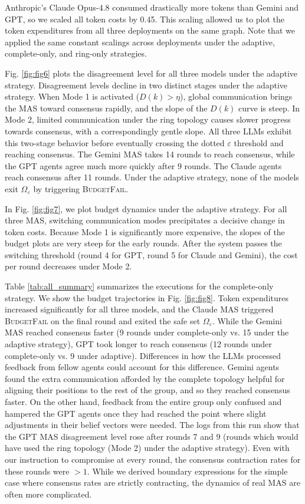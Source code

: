 \documentclass[journal,twoside,web]{ieeecolor_no_firstpage_logo}
\begin{document}
Anthropic's Claude Opus-4.8 consumed drastically more tokens than Gemini and GPT, so we scaled all token costs by 0.45. This scaling allowed us to plot the token expenditures from all three deployments on the same graph. Note that we applied the same constant scalings across deployments under the adaptive, complete-only, and ring-only strategies. 

Fig. \ref{fig:fig6} plots the disagreement level for all three models under the adaptive strategy. Disagreement levels decline in two distinct stages under the adaptive strategy. When Mode 1 is activated ($D(k)> \eta$), global communication brings the MAS toward consensus rapidly, and the slope of the $D(k)$ curve is steep. In Mode 2, limited communication under the ring topology causes slower progress towards consensus, with a correspondingly gentle slope. All three LLMs exhibit this two-stage behavior before eventually crossing the dotted $\varepsilon$ threshold and reaching consensus.
 The Gemini MAS takes 14 rounds to reach consensus, while the GPT agents agree much more quickly after 9 rounds. The Claude agents reach consensus after 11 rounds. Under the adaptive strategy, none of the  models exit $\Omega_\varepsilon$ by triggering \textsc{BudgetFail}. 

In Fig. \ref{fig:fig7}, we plot budget dynamics under the adaptive strategy. For all three MAS, switching communication modes precipitates a decisive change in token costs. Because Mode 1 is significantly more expensive, the slopes of the budget plots are very steep for the early rounds. After the system passes the switching threshold (round 4 for GPT, round 5 for Claude and Gemini), the cost per round decreases under Mode 2.

Table \ref{tab:all_summary} summarizes the executions for the complete-only strategy. We show the budget trajectories in Fig. \ref{fig:fig8}. Token expenditures increased significantly for all three models, and the Claude MAS triggered \textsc{BudgetFail} on the final round and exited the safe set $\Omega_\varepsilon$. While the Gemini MAS reached consensus faster (9 rounds under complete-only vs. 15 under the adaptive strategy), GPT took longer to reach consensus (12 rounds under complete-only vs. 9 under adaptive). Differences in how the LLMs processed feedback from fellow agents could account for this difference. Gemini agents found the extra communication afforded by the complete topology helpful for aligning their positions to the rest of the group, and so they reached consensus faster. On the other hand, feedback from the entire group only confused and hampered the GPT agents once they had reached the point where slight adjustments in their belief vectors were needed. The logs from this run show that the GPT MAS disagreement level rose after rounds 7 and 9 (rounds which would have used the ring topology (Mode 2) under the adaptive strategy). Even with our instruction to compromise at every round, the consensus contraction rates for these rounds were $> 1.$ While we derived boundary expressions for the simple case where consensus rates are strictly contracting, the dynamics of real MAS are often more complicated. 
\end{document}
